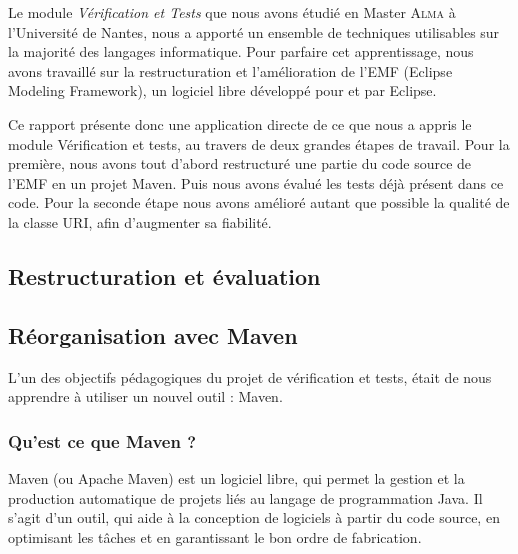 \documentclass[a4paper]{article}
\begin{document}
	\vspace{0.5cm}

	Le module \textit{Vérification et Tests} que nous avons étudié en Master \textsc{Alma} à l’Université de Nantes, nous a apporté un ensemble de techniques utilisables sur la majorité des langages informatique. Pour parfaire cet apprentissage, nous avons travaillé sur la restructuration et l'amélioration de l'EMF (Eclipse Modeling Framework), un logiciel libre développé pour et par Eclipse.

	\vspace{0.5cm}

	Ce rapport présente donc une application directe de ce que nous a appris le module Vérification et tests, au travers de deux grandes étapes de travail. Pour la première, nous avons tout d'abord restructuré une partie du code source de l'EMF en un projet Maven. Puis nous avons évalué les tests déjà présent dans ce code. Pour la seconde étape nous avons amélioré autant que possible la qualité de la classe URI, afin d'augmenter sa fiabilité.

	\newpage


	\begin{center}
		\section{Restructuration et évaluation}
	\end{center}

	\vspace{0.5cm}

		\subsection{Réorganisation avec Maven}

		\vspace{0.5cm}

		L'un des objectifs pédagogiques du projet de vérification et tests, était de nous apprendre à utiliser un nouvel outil : Maven. 

		\subsubsection{Qu'est ce que Maven ?}

		\vspace{0.5cm}

		Maven (ou Apache Maven) est un logiciel libre, qui permet la gestion et la production automatique de projets liés au langage de programmation Java. Il s'agit d'un outil, qui aide à la conception de logiciels à partir du code source, en optimisant les tâches et en garantissant le bon ordre de fabrication.
\end{document}
